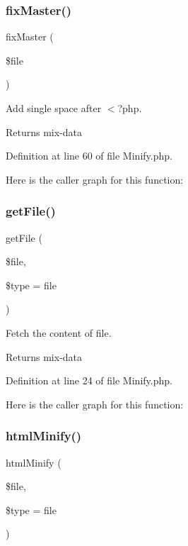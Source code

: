 \subsubsection{\texorpdfstring{fix\+Master()}{fixMaster()}}
{\footnotesize\ttfamily fix\+Master (\begin{DoxyParamCaption}\item[{}]{\$file }\end{DoxyParamCaption})}

Add single space after $<$?php.

\begin{DoxyReturn}{Returns}
mix-\/data 
\end{DoxyReturn}


Definition at line 60 of file Minify.\+php.

Here is the caller graph for this function\+:
\mbox{\label{class_zest_1_1_common_1_1_minify_a905ce83166cd7dd044a49a0d479c4399}} 
\subsubsection{\texorpdfstring{get\+File()}{getFile()}}
{\footnotesize\ttfamily get\+File (\begin{DoxyParamCaption}\item[{}]{\$file,  }\item[{}]{\$type = {\ttfamily \textquotesingle{}file\textquotesingle{}} }\end{DoxyParamCaption})}

Fetch the content of file.

\begin{DoxyReturn}{Returns}
mix-\/data 
\end{DoxyReturn}


Definition at line 24 of file Minify.\+php.

Here is the caller graph for this function\+:
\mbox{\label{class_zest_1_1_common_1_1_minify_a3790247f749067336585a340fa8aba3a}} 
\subsubsection{\texorpdfstring{html\+Minify()}{htmlMinify()}}
{\footnotesize\ttfamily html\+Minify (\begin{DoxyParamCaption}\item[{}]{\$file,  }\item[{}]{\$type = {\ttfamily \textquotesingle{}file\textquotesingle{}} }\end{DoxyParamCaption})}

